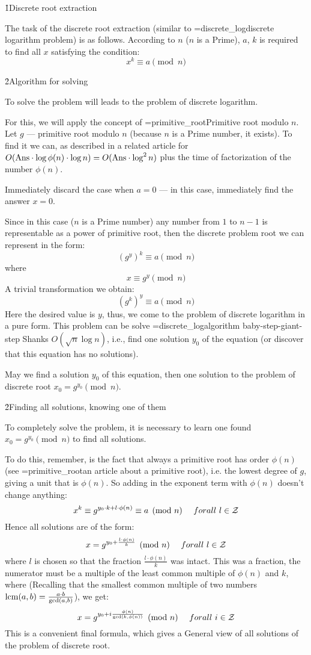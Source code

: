 \h1{Discrete root extraction}

The task of the discrete root extraction (similar to \algohref=discrete_log{discrete logarithm problem}) is as follows. According to $n$ ($n$ is a Prime), $a$, $k$ is required to find all $x$ satisfying the condition:
$$ x^k \equiv a \pmod{n} $$

\h2{Algorithm for solving}

To solve the problem will leads to the problem of discrete logarithm.

For this, we will apply the concept of \algohref=primitive_root{Primitive root modulo $n$}. Let $g$ --- primitive root modulo $n$ (because $n$ is a Prime number, it exists). To find it we can, as described in a related article for $O( {\rm Ans} \cdot \log \phi(n) \cdot \log n) = O( {\rm Ans} \cdot \log^2 n)$ plus the time of factorization of the number $\phi(n)$.

Immediately discard the case when $a=0$ --- in this case, immediately find the answer $x=0$.

Since in this case ($n$ is a Prime number) any number from $1$ to $n-1$ is representable as a power of primitive root, then the discrete problem root we can represent in the form:
$$ {\left( g^y \right)}^k \equiv a \pmod{n} $$
where
$$ x \equiv g^y \pmod{n} $$
A trivial transformation we obtain:
$$ {\left( g^k \right)}^y \equiv a \pmod{n} $$
Here the desired value is $y$, thus, we come to the problem of discrete logarithm in a pure form. This problem can be solve \algohref=discrete_log{algorithm baby-step-giant-step Shanks} $O( \sqrt{n} \log n )$, i.e., find one solution $y_0$ of the equation (or discover that this equation has no solutions).

May we find a solution $y_0$ of this equation, then one solution to the problem of discrete root $x_0 = g^{y_0} \pmod{n}$.

\h2{Finding all solutions, knowing one of them}

To completely solve the problem, it is necessary to learn one found $x_0 = g^{y_0} \pmod{n}$ to find all solutions.

To do this, remember, is the fact that always a primitive root has order $\phi(n)$ (see \algohref=primitive_root{an article about a primitive root}), i.e. the lowest degree of $g$, giving a unit that is $\phi(n)$. So adding in the exponent term with $\phi(n)$ doesn't change anything:
$$ x^k \equiv g^{ y_0 \cdot k + l \cdot \phi(n) } \equiv a \pmod{n}\ \ \ \ forall\ l \in {\cal Z} $$
Hence all solutions are of the form:
$$ x = g^{ y_0 + \frac{ l \cdot \phi(n) }{ k } } \pmod{n}\ \ \ \ forall\ l \in {\cal Z} $$
where $l$ is chosen so that the fraction $\frac{ l \cdot \phi(n) }{ k }$ was intact. This was a fraction, the numerator must be a multiple of the least common multiple of $\phi(n)$ and $k$, where (Recalling that the smallest common multiple of two numbers ${\rm lcm}(a,b) = \frac{ a \cdot b }{ {\rm gcd}(a,b) }$), we get:
$$ x = g^{ y_0 + i \frac{ \phi(n) }{ {\rm gcd}(k,\phi(n)) } } \pmod{n}\ \ \ \ forall\ i \in {\cal Z} $$
This is a convenient final formula, which gives a General view of all solutions of the problem of discrete root.

